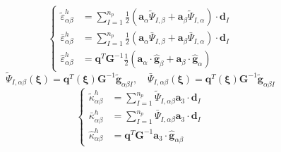 \begin{equation}
\left \{
\begin{split}
\tilde \varepsilon^h_{\alpha\beta} &= \sum_{I=1}^{n_p} \frac{1}{2}(\boldsymbol a_\alpha \tilde \Psi_{I,\beta} + \boldsymbol a_\beta \tilde \Psi_{I,\alpha}) \cdot \boldsymbol d_I \\
\bar \varepsilon^h_{\alpha\beta} &= \sum_{I=1}^{n_p} \frac{1}{2}(\boldsymbol a_\alpha \bar \Psi_{I,\beta} + \boldsymbol a_\beta \bar \Psi_{I,\alpha}) \cdot \boldsymbol d_I \\
\hat \varepsilon^h_{\alpha\beta} &= \boldsymbol q^T \boldsymbol G^{-1} \frac{1}{2}(\boldsymbol a_\alpha\cdot\hat{\boldsymbol g}_\beta + \boldsymbol a_\beta \cdot \hat{\boldsymbol g}_\alpha)
\end{split}
\right .
\end{equation}
\begin{equation}
\tilde{\Psi}_{I,\alpha\beta}(\boldsymbol \xi) = \boldsymbol q^T(\boldsymbol \xi) \boldsymbol G^{-1} \tilde{\boldsymbol g}_{\alpha\beta I}, \quad
\bar{\Psi}_{I,\alpha\beta}(\boldsymbol \xi) = \boldsymbol q^T(\boldsymbol \xi) \boldsymbol G^{-1} \tilde{\boldsymbol g}_{\alpha\beta I}
\end{equation}
\begin{equation}
\left \{
\begin{split}
\tilde \kappa^h_{\alpha\beta} &= \sum_{I=1}^{n_p} \tilde \Psi_{I,\alpha\beta}\boldsymbol a_3 \cdot \boldsymbol d_I \\
\bar \kappa^h_{\alpha\beta} &= \sum_{I=1}^{n_p} \bar \Psi_{I,\alpha\beta}\boldsymbol a_3 \cdot \boldsymbol d_I \\
\hat \kappa^h_{\alpha\beta} &= \boldsymbol q^T \boldsymbol G^{-1} \boldsymbol a_3 \cdot \hat{\boldsymbol g}_{\alpha\beta}
\end{split}
\right .
\end{equation}

